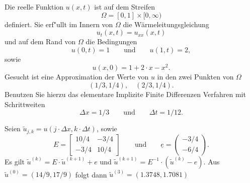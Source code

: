 Die reelle Funktion $u(x,t)$ ist auf dem Streifen
\[
\Omega = [0, 1] \times [0,\infty)
\]
definiert. Sie erf"ullt im Innern von $\Omega$ die W\"armeleitungsgleichung
\[
u_{t}(x,t) = u_{xx}(x,t)
\]
und auf dem Rand von $\Omega$ die Bedingungen
\[
u(0,t) = 1 \qquad \text{und} \qquad  u(1,t) = 2,
\]
sowie
\[
u(x,0) = 1 + 2 \cdot x - x^2.
\]
Gesucht ist eine Approximation der Werte von $u$ in den zwei Punkten von $\Omega$
\[
(1/3, 1/4), \quad  (2/3, 1/4).
\]
Benutzen Sie hierzu das elementare Implizite Finite Differenzen Verfahren mit Schrittweiten
\[
\Delta x = 1/3 \qquad  \text{und} \qquad \Delta t = 1/12.
\]

\begin{loesung}
Seien $\tilde u_{j,k} = u(j \cdot \Delta x, k \cdot \Delta t)$, sowie
\[
E
=
\left[
\begin{array}{rr}
10/4 & - 3/4 \\
-3/4 & 10/4
\end{array}\right]
\qquad
\text{und}
\qquad
\underline{e}
=
\begin{pmatrix}
-3/4 \\ -6/4
\end{pmatrix}.
\]
Es gilt $\tilde u^{(k)} = E \cdot \tilde u^{(k+1)} + e$
und $\tilde u^{(k+1)} = E^{-1} \cdot (\tilde u^{(k)} - e).$
Aus $\tilde u^{(0)} = (14/9, 17/9)$ folgt dann
$\tilde u^{(3)} = (1.3748, 1.7081)$
\end{loesung}

